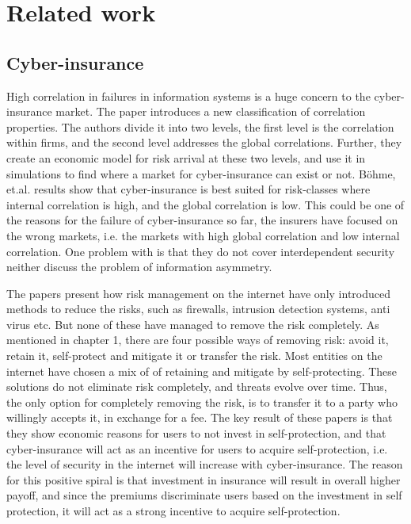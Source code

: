 \chapter{Related work}
\label{chp:relatedwork} 



\section{Cyber-insurance}



High correlation in failures in information systems is a huge concern to the cyber-insurance market. The paper \cite{bohme2006models} introduces a new classification of correlation properties. The authors divide it into two levels, the first level is the correlation within firms, and the second level addresses the global correlations. Further, they create an economic model for risk arrival at these two levels, and use it in simulations to find where a market for cyber-insurance can exist or not. Böhme, et.al. results show that cyber-insurance is best suited for risk-classes where internal correlation is high, and the global correlation is low. This could be one of the reasons for the failure of cyber-insurance so far, the insurers have focused on the wrong markets, i.e. the markets with high global correlation and low internal correlation. One problem with \cite{bohme2006models} is that they do not cover interdependent security neither discuss the problem of information asymmetry.  

The papers \cite{bolot2008cyber, bolot2008new} present how risk management on the internet have only introduced methods to reduce the risks, such as firewalls, intrusion detection systems, anti virus etc. But none of these have managed to remove the risk completely. As mentioned in chapter 1, there are four possible ways of removing risk: avoid it, retain it, self-protect and mitigate it or transfer the risk. Most entities on the internet have chosen a mix of of retaining and mitigate by self-protecting. These solutions do not eliminate risk completely, and threats evolve over time. Thus, the only option for completely removing the risk, is to transfer it to a party who willingly accepts it, in exchange for a fee. 
The key result of these papers is that they show economic reasons for users to not invest in self-protection, and that cyber-insurance will act as an incentive for users to acquire self-protection, i.e. the level of security in the internet will increase with cyber-insurance. The reason for this positive spiral is that investment in insurance will result in overall higher payoff, and since the premiums discriminate users based on the investment in self protection, it will act as a strong incentive to acquire self-protection. 

